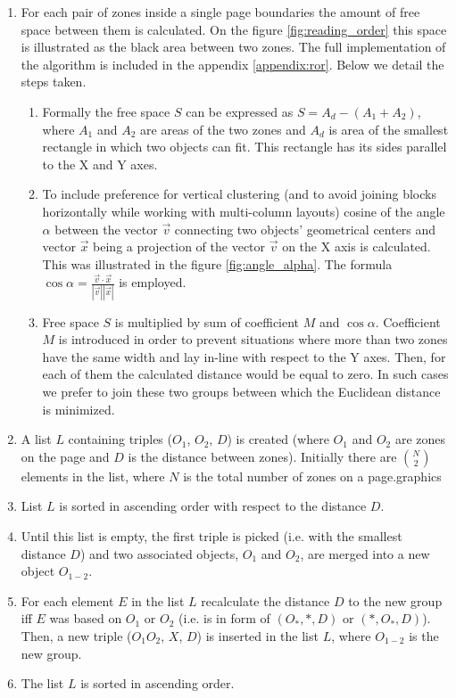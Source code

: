 \begin{enumerate}
\item For each pair of zones inside a single page boundaries the amount of free space between them is calculated. On the figure \ref{fig:reading_order} this space is illustrated as the black area between two zones. The full implementation of the algorithm is included in the appendix \ref{appendix:ror}. Below we detail the steps taken.
	\begin{enumerate} 
	\item Formally the free space $S$ can be expressed as $S = A_d - (A_1+A_2)$, where $A_1$ and $A_2$ are areas of the two zones and $A_d$ is area of the smallest rectangle in which two objects can fit. This rectangle has its sides parallel to the X and Y axes.
	\item To include preference for vertical clustering (and to avoid joining blocks horizontally while working with multi-column layouts) cosine of the angle $\alpha$ between the vector $\vec{v}$ connecting two objects' geometrical centers and vector $\vec{x}$ being a projection of the vector $\vec{v}$ on the X axis is calculated. This was illustrated in the figure \ref{fig:angle_alpha}. The formula $\cos\alpha = \frac{\vec{v} \cdot \vec{x}}{|\vec{v}||\vec{x}|}$ is employed.
	\item Free space $S$ is multiplied by sum of coefficient $M$ and $\cos\alpha$. Coefficient $M$ is introduced in order to prevent situations where more than two zones have the same width and lay in-line with respect to the Y axes. Then, for each of them the calculated distance would be equal to zero. In such cases we prefer to join these two groups between which the Euclidean distance is minimized.
	\end{enumerate}
\item A list $L$ containing triples ($O_1$, $O_2$, $D$) is created (where $O_1$ and $O_2$ are zones on the page and $D$ is the distance between zones). Initially there are $\binom{N}{2}$ elements in the list, where $N$ is the total number of zones on a page.graphics
\item List $L$ is sorted in ascending order with respect to the distance $D$. 
\item Until this list is empty, the first triple is picked (i.e. with the smallest distance $D$) and two associated objects, $O_1$ and $O_2$, are merged into a new object $O_{1-2}$.
\item For each element $E$ in the list $L$ recalculate the distance $D$ to the new group iff $E$ was based on $O_1$ or $O_2$ (i.e. is in form of $(O_*, *, D)$ or $(*, O_*, D)$). Then, a new triple ($O_1O_2$, $X$, $D$) is inserted in the list $L$, where $O_{1-2}$ is the new group.
\item The list $L$ is sorted in ascending order.
\end{enumerate}
